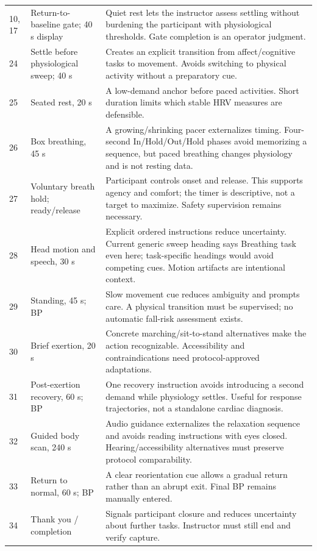 \documentclass[11pt,a4paper]{article}
\begin{document}
\begin{longtable}{@{}L{.09\textwidth}L{.31\textwidth}L{.53\textwidth}@{}}
10, 17 & Return-to-baseline gate; 40 s display & Quiet rest lets the instructor assess settling without burdening the participant with physiological thresholds. Gate completion is an operator judgment.\\
24 & Settle before physiological sweep; 40 s & Creates an explicit transition from affect/cognitive tasks to movement. Avoids switching to physical activity without a preparatory cue.\\
25 & Seated rest, 20 s & A low-demand anchor before paced activities. Short duration limits which stable HRV measures are defensible.\\
26 & Box breathing, 45 s & A growing/shrinking pacer externalizes timing. Four-second In/Hold/Out/Hold phases avoid memorizing a sequence, but paced breathing changes physiology and is not resting data.\\
27 & Voluntary breath hold; ready/release & Participant controls onset and release. This supports agency and comfort; the timer is descriptive, not a target to maximize. Safety supervision remains necessary.\\
28 & Head motion and speech, 30 s & Explicit ordered instructions reduce uncertainty. Current generic sweep heading says Breathing task even here; task-specific headings would avoid competing cues. Motion artifacts are intentional context.\\
29 & Standing, 45 s; BP & Slow movement cue reduces ambiguity and prompts care. A physical transition must be supervised; no automatic fall-risk assessment exists.\\
30 & Brief exertion, 20 s & Concrete marching/sit-to-stand alternatives make the action recognizable. Accessibility and contraindications need protocol-approved adaptations.\\
31 & Post-exertion recovery, 60 s; BP & One recovery instruction avoids introducing a second demand while physiology settles. Useful for response trajectories, not a standalone cardiac diagnosis.\\
32 & Guided body scan, 240 s & Audio guidance externalizes the relaxation sequence and avoids reading instructions with eyes closed. Hearing/accessibility alternatives must preserve protocol comparability.\\
33 & Return to normal, 60 s; BP & A clear reorientation cue allows a gradual return rather than an abrupt exit. Final BP remains manually entered.\\
34 & Thank you / completion & Signals participant closure and reduces uncertainty about further tasks. Instructor must still end and verify capture.\\
\bottomrule
\end{longtable}
\normalsize
\end{document}
